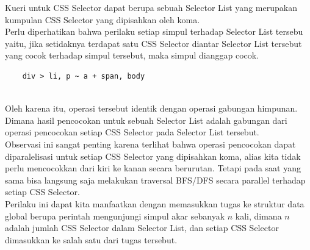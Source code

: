 \documentclass[12pt,a4paper]{article}
\begin{document}
\begin{itemize}
Kueri untuk CSS Selector dapat berupa sebuah Selector List yang merupakan kumpulan CSS Selector yang dipisahkan oleh koma. \\

Perlu diperhatikan bahwa perilaku setiap simpul terhadap Selector List tersebu yaitu, jika setidaknya terdapat satu CSS Selector diantar Selector List
tersebut yang cocok terhadap simpul tersebut, maka simpul dianggap cocok. \\

\begin{verbatim}
    div > li, p ~ a + span, body
\end{verbatim} \\

Oleh karena itu, operasi tersebut identik dengan operasi gabungan himpunan.
Dimana hasil pencocokan untuk sebuah Selector List adalah gabungan dari operasi pencocokan setiap CSS Selector pada Selector List tersebut. \\

Observasi ini sangat penting karena terlihat bahwa operasi pencocokan dapat diparalelisasi untuk setiap CSS Selector yang dipisahkan koma,
alias kita tidak perlu mencocokkan dari kiri ke kanan secara berurutan. Tetapi pada saat yang sama bisa langsung saja melakukan traversal BFS/DFS secara parallel terhadap setiap CSS Selector. \\

Perilaku ini dapat kita manfaatkan dengan memasukkan tugas ke struktur data global berupa perintah mengunjungi
simpul akar sebanyak $n$ kali, dimana $n$ adalah jumlah CSS Selector dalam Selector List, 
dan setiap CSS Selector dimasukkan ke salah satu dari tugas tersebut. \\



\end{itemize}
\end{document}
